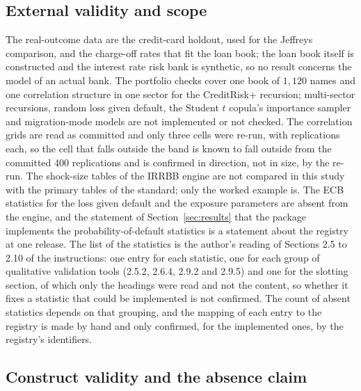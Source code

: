 \subsection{External validity and scope}

The real-outcome data are the credit-card holdout, used for the Jeffreys comparison, and the charge-off rates that fit the loan book; the loan book itself is constructed and the interest rate risk bank is synthetic, so no result concerns the model of an actual bank. The portfolio checks cover one book of \(1{,}120\) names and one correlation structure in one sector for the CreditRisk+ recursion; multi-sector recursions, random loss given default, the Student $t$ copula's importance sampler and migration-mode models are not implemented or not checked. The correlation grids are read as committed and only three cells were re-run, with \cellReps{} replications each, so the cell that falls outside the band is known to fall outside from the committed 400 replications and is confirmed in direction, not in size, by the re-run. The shock-size tables of the IRRBB engine are not compared in this study with the primary tables of the standard; only the worked example is. The ECB statistics for the loss given default and the exposure parameters are absent from the engine, and the statement of Section~\ref{sec:results} that the package implements the probability-of-default statistics is a statement about the registry at one release. The list of the \ecbSections{} statistics is the author's reading of Sections 2.5 to 2.10 of the instructions: one entry for each statistic, one for each group of qualitative validation tools (2.5.2, 2.6.4, 2.9.2 and 2.9.5) and one for the slotting section, of which only the headings were read and not the content, so whether it fixes a statistic that could be implemented is not confirmed. The count of absent statistics depends on that grouping, and the mapping of each entry to the registry is made by hand and only confirmed, for the implemented ones, by the registry's identifiers.

\subsection{Construct validity and the absence claim}

